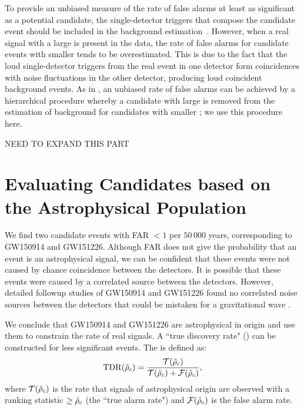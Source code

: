 To provide an unbiased measure of the rate of false alarms at least as significant as a potential candidate, the single-detector triggers that compose the candidate event should be included in the background estimation~\citep{2017PhRvD..96h2002C}. However, when a real signal with a large \rankingstat{} is present in the data, the rate of false alarms for candidate events with smaller \rankingstat{} tends to be overestimated. This is due to the fact that the loud single-detector triggers from the real event in one detector form coincidences with noise fluctuations in the other detector, producing loud coincident background events. As in \cite{TheLIGOScientific:2016pea}, an unbiased rate of false alarms can be achieved by a hierarchical procedure whereby a candidate with large \rankingstat{} is removed from the estimation of background for candidates with smaller \rankingstat{}; we use this procedure here.

NEED TO EXPAND THIS PART

\section{Evaluating Candidates based on the Astrophysical Population}
\label{sec:tdr} 

We find two candidate events with
FAR $< 1$ per $50\,000$ years, corresponding to GW150914 and GW151226.
Although FAR does not give the probability that an event is an astrophysical signal,
we can be confident that these events were not caused by chance
coincidence between the detectors. It is possible that these
events were caused by a correlated source between the detectors. However, detailed followup
studies of GW150914 and GW151226 found no correlated noise sources between the detectors
that could be mistaken for a gravitational wave \citep{TheLIGOScientific:2016zmo, Abbott:2016nmj}.

We conclude that GW150914 and GW151226 are astrophysical in origin and use them to constrain the rate of real signals. A ``true discovery rate"
(\tdr{}) can be constructed for less significant events. The \tdr{} is defined as:
%
\begin{equation}
\mathrm{TDR}(\tilde{\rho}_c) = \frac{\mathcal{T}(\tilde{\rho}_c)}{\mathcal{T}(\tilde{\rho}_c) + \mathcal{F}(\tilde{\rho}_c)},
\end{equation}
%
where $\mathcal{T}(\tilde{\rho}_c)$ is the rate that signals of astrophysical origin are observed with
a ranking statistic $\geq \tilde{\rho}_c$ (the ``true alarm rate") and
$\mathcal{F}(\tilde{\rho}_c)$ is the false alarm rate.

